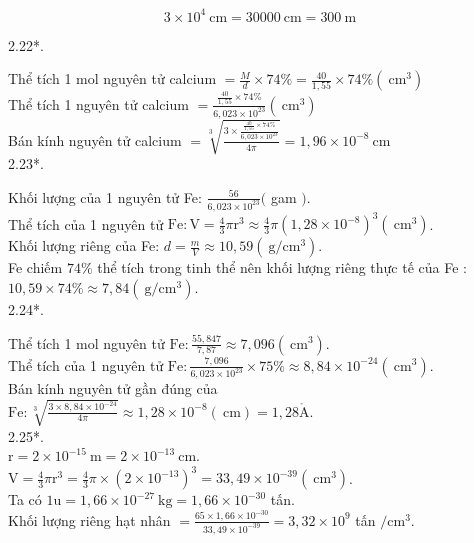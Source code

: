 \documentclass[10pt]{article}
\def\AA{\mathring{\mathrm{A}}}
\begin{document}
$$
3 \times 10^{4} \mathrm{~cm}=30000 \mathrm{~cm}=300 \mathrm{~m}
$$

2.22*.

Thể tích 1 mol nguyên tử calcium $=\frac{M}{d} \times 74 \%=\frac{40}{1,55} \times 74 \%\left(\mathrm{~cm}^{3}\right)$\\
Thể tích 1 nguyên tử calcium $=\frac{\frac{40}{1,55} \times 74 \%}{6,023 \times 10^{23}}\left(\mathrm{~cm}^{3}\right)$\\
Bán kính nguyên tử calcium $=\sqrt[3]{\frac{3 \times \frac{\frac{40}{1,55} \times 74 \%}{6,023 \times 10^{23}}}{4 \pi}}=1,96 \times 10^{-8} \mathrm{~cm}$\\
2.23*.

Khối lượng của 1 nguyên tử Fe: $\frac{56}{6,023 \times 10^{23}}($ gam $)$.\\
Thể tích của 1 nguyên tử $\mathrm{Fe}: \mathrm{V}=\frac{4}{3} \pi \mathrm{r}^{3} \approx \frac{4}{3} \pi\left(1,28 \times 10^{-8}\right)^{3}\left(\mathrm{~cm}^{3}\right)$.\\
Khối lượng riêng của Fe: $d=\frac{m}{V} \approx 10,59\left(\mathrm{~g} / \mathrm{cm}^{3}\right)$.\\
Fe chiếm $74 \%$ thể tích trong tinh thể nên khối lượng riêng thực tế của Fe :\\
$10,59 \times 74 \% \approx 7,84\left(\mathrm{~g} / \mathrm{cm}^{3}\right)$.\\
2.24*.

Thể tích 1 mol nguyên tử $\mathrm{Fe}: \frac{55,847}{7,87} \approx 7,096\left(\mathrm{~cm}^{3}\right)$.\\
Thể tích của 1 nguyên tử $\mathrm{Fe}: \frac{7,096}{6,023 \times 10^{23}} \times 75 \% \approx 8,84 \times 10^{-24}\left(\mathrm{~cm}^{3}\right)$.\\
Bán kính nguyên tử gần đúng của $\mathrm{Fe}: \sqrt[3]{\frac{3 \times 8,84 \times 10^{-24}}{4 \pi}} \approx 1,28 \times 10^{-8}(\mathrm{~cm})=1,28 \AA$.\\
2.25*.\\
$\mathrm{r}=2 \times 10^{-15} \mathrm{~m}=2 \times 10^{-13} \mathrm{~cm}$.\\
$\mathrm{V}=\frac{4}{3} \pi \mathrm{r}^{3}=\frac{4}{3} \pi \times\left(2 \times 10^{-13}\right)^{3}=33,49 \times 10^{-39}\left(\mathrm{~cm}^{3}\right)$.\\
Ta có $1 \mathrm{u}=1,66 \times 10^{-27} \mathrm{~kg}=1,66 \times 10^{-30}$ tấn.\\
Khối lượng riêng hạt nhân $=\frac{65 \times 1,66 \times 10^{-30}}{33,49 \times 10^{-39}}=3,32 \times 10^{9}$ tấn $/ \mathrm{cm}^{3}$.
\end{document}
